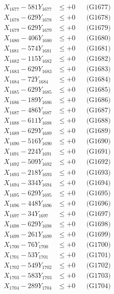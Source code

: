 \documentclass[a4paper,10pt]{article}
\begin{document}
{\begin{align}
X_{1677} - 581Y_{1677} &\leq +0 && \text{(G1677)} \\
X_{1678} - 629Y_{1678} &\leq +0 && \text{(G1678)} \\
X_{1679} - 629Y_{1679} &\leq +0 && \text{(G1679)} \\
X_{1680} - 406Y_{1680} &\leq +0 && \text{(G1680)} \\
\allowbreak
X_{1681} - 574Y_{1681} &\leq +0 && \text{(G1681)} \\
X_{1682} - 115Y_{1682} &\leq +0 && \text{(G1682)} \\
X_{1683} - 629Y_{1683} &\leq +0 && \text{(G1683)} \\
X_{1684} - 72Y_{1684} &\leq +0 && \text{(G1684)} \\
X_{1685} - 629Y_{1685} &\leq +0 && \text{(G1685)} \\
X_{1686} - 189Y_{1686} &\leq +0 && \text{(G1686)} \\
X_{1687} - 486Y_{1687} &\leq +0 && \text{(G1687)} \\
X_{1688} - 611Y_{1688} &\leq +0 && \text{(G1688)} \\
X_{1689} - 629Y_{1689} &\leq +0 && \text{(G1689)} \\
X_{1690} - 516Y_{1690} &\leq +0 && \text{(G1690)} \\
\allowbreak
X_{1691} - 224Y_{1691} &\leq +0 && \text{(G1691)} \\
X_{1692} - 509Y_{1692} &\leq +0 && \text{(G1692)} \\
X_{1693} - 218Y_{1693} &\leq +0 && \text{(G1693)} \\
X_{1694} - 334Y_{1694} &\leq +0 && \text{(G1694)} \\
X_{1695} - 629Y_{1695} &\leq +0 && \text{(G1695)} \\
X_{1696} - 448Y_{1696} &\leq +0 && \text{(G1696)} \\
X_{1697} - 34Y_{1697} &\leq +0 && \text{(G1697)} \\
X_{1698} - 629Y_{1698} &\leq +0 && \text{(G1698)} \\
X_{1699} - 261Y_{1699} &\leq +0 && \text{(G1699)} \\
X_{1700} - 76Y_{1700} &\leq +0 && \text{(G1700)} \\
\allowbreak
X_{1701} - 53Y_{1701} &\leq +0 && \text{(G1701)} \\
X_{1702} - 549Y_{1702} &\leq +0 && \text{(G1702)} \\
X_{1703} - 583Y_{1703} &\leq +0 && \text{(G1703)} \\
X_{1704} - 289Y_{1704} &\leq +0 && \text{(G1704)} \\

\end{align}}
\end{document}
